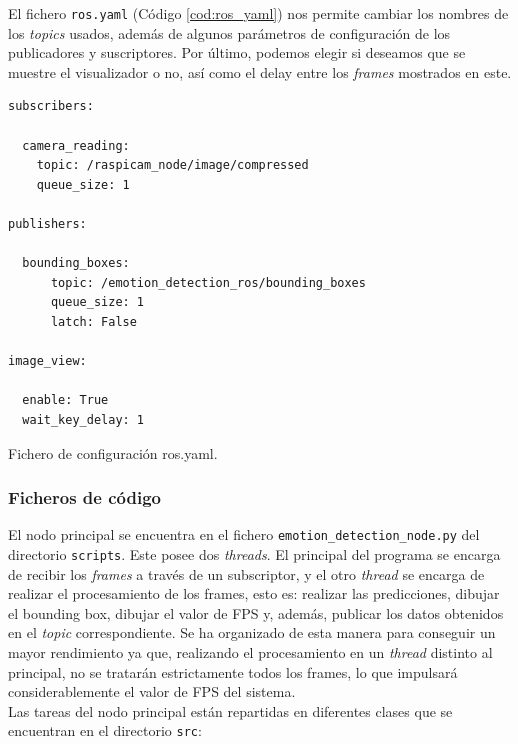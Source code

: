 El fichero \verb|ros.yaml| (Código \ref{cod:ros_yaml}) nos permite cambiar los nombres de los \textit{topics} usados, además de algunos parámetros de configuración de los publicadores y suscriptores. Por último, podemos elegir si deseamos que se muestre el visualizador o no, así como el delay entre los \textit{frames} mostrados en este.

\begin{code}[h]
\begin{lstlisting}
subscribers:

  camera_reading:
    topic: /raspicam_node/image/compressed
    queue_size: 1

publishers:

  bounding_boxes:
      topic: /emotion_detection_ros/bounding_boxes
      queue_size: 1
      latch: False

image_view:

  enable: True
  wait_key_delay: 1
\end{lstlisting}
\captionsetup{justification=centering}
\caption[Fichero de configuración ros.yaml.]{Fichero de configuración ros.yaml.}
\label{cod:ros_yaml}
\end{code}

\subsubsection{Ficheros de código}

El nodo principal se encuentra en el fichero \verb|emotion_detection_node.py| del directorio \verb|scripts|. Este posee dos \textit{threads}. El principal del programa se encarga de recibir los \textit{frames} a través de un subscriptor, y el otro \textit{thread} se encarga de realizar el procesamiento de los frames, esto es: realizar las predicciones, dibujar el bounding box, dibujar el valor de FPS y, además, publicar los datos obtenidos en el \textit{topic} correspondiente. Se ha organizado de esta manera para conseguir un mayor rendimiento ya que, realizando el procesamiento en un \textit{thread} distinto al principal, no se tratarán estrictamente todos los frames, lo que impulsará considerablemente el valor de FPS del sistema.\\

Las tareas del nodo principal están repartidas en diferentes clases que se encuentran en el directorio \verb|src|:

